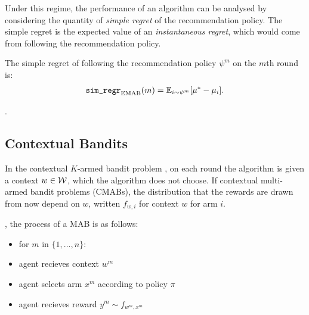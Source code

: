         Under this regime, the performance of an algorithm can be analysed by considering the quantity of \textit{simple regret} of the recommendation policy. The simple regret is the expected value of an \textit{instantaneous regret},  which would come from following the recommendation policy.

        \begin{defn}
            The \textnormal{simple regret} of following the recommendation policy $\psi^m$ on the $m$th round is:
            \begin{align}
                {\textnormal{\texttt{sim\_regr}}}_{{\textnormal{EMAB}}}(m) = \mathbb{E}_{i\sim\psi^m}[\mu^* - \mu_i].
            \end{align}
        \end{defn}


        .



    
    \subsection{Contextual Bandits}
    \label{sec:2-2-2-contextual-mab}


        In the contextual $K$-armed bandit problem , on each round the algorithm is given a context $w\in \mathcal{W}$, which the algorithm does not choose. If contextual multi-armed bandit problems (CMABs), the distribution that the rewards are drawn from now depend on $w$, written $f_{w,i}$ for context $w$ for arm $i$. 


        , the process of a MAB is as follows:
        \begin{itemize}
            \item for $m$ in $\{1,...,n\}$:
            \item agent recieves context $w^m$
            \item agent selects arm $x^m$ according to policy $\pi$
            \item agent recieves reward $y^m \sim f_{w^m,x^m}$
        \end{itemize}

